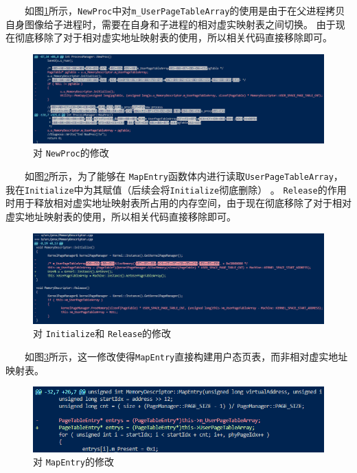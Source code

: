 　　如图\ref{NewProc}所示，\texttt{NewProc}中对\texttt{m\_UserPageTableArray}的使用是由于在父进程拷贝自身图像给子进程时，需要在自身和子进程的相对虚实映射表之间切换。
由于现在彻底移除了对于相对虚实地址映射表的使用，所以相关代码直接移除即可。

\begin{figure}[!htbp]
    \centering
    \includegraphics[width=\textwidth]{images/NewProc.png}
    \caption{对 \texttt{NewProc}的修改}\label{NewProc}
\end{figure}

　　如图\ref{initRel}所示，为了能够在 \texttt{MapEntry}函数体内进行读取\texttt{UserPageTableArray}，我在\texttt{Initialize}中为其赋值（后续会将\texttt{Initialize}彻底删除） 。
\texttt{Release}的作用时用于释放相对虚实地址映射表所占用的内存空间，由于现在彻底移除了对于相对虚实地址映射表的使用，所以相关代码直接移除即可。

\begin{figure}[!htbp]
    \centering
    \includegraphics[width=\textwidth]{images/Initialize_Release.png}
    \caption{对 \texttt{Initialize}和 \texttt{Release}的修改}\label{initRel}
\end{figure}

　　如图\ref{MapEntry}所示，这一修改使得\texttt{MapEntry}直接构建用户态页表，而非相对虚实地址映射表。

\begin{figure}[!htbp]
    \centering
    \includegraphics[width=\textwidth]{images/MapEntry.png}
    \caption{对 \texttt{MapEntry}的修改}\label{MapEntry}
\end{figure}

